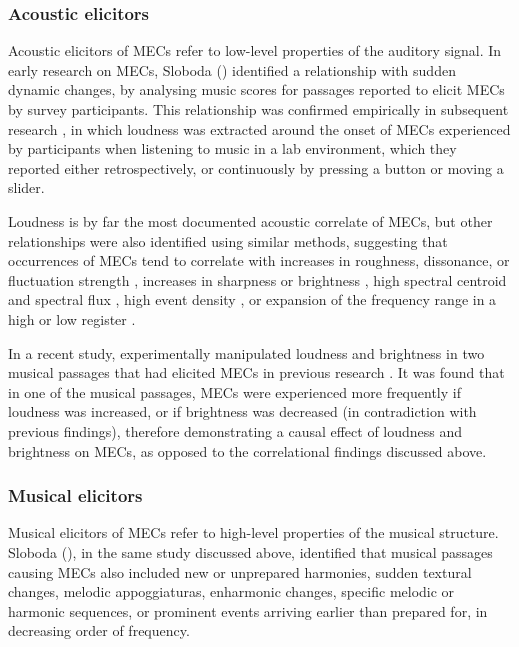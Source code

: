 \subsubsection{Acoustic elicitors}

Acoustic elicitors of MECs refer to low-level properties of the auditory signal. In early research on MECs, Sloboda (\citeyear{sloboda1991}) identified a relationship with sudden dynamic changes, by analysing music scores for passages reported to elicit MECs by survey participants. This relationship was confirmed empirically in subsequent research \parencite{auricchio2017,bannister2018,beier2020,grewe2007,guhn2007,honda2020,nagel2008,polo2017}, in which loudness was extracted \parencite[or manually inspected from music scores in the case of][]{guhn2007} around the onset of MECs experienced by participants when listening to music in a lab environment, which they reported either retrospectively, or continuously by pressing a button or moving a slider.

Loudness is by far the most documented acoustic correlate of MECs, but other relationships were also identified using similar methods, suggesting that occurrences of MECs tend to correlate with increases in roughness, dissonance, or fluctuation strength \parencite{bannister2018,beier2020,grewe2007,nagel2008,park2019}, increases in sharpness or brightness \parencite{bannister2018,beier2020,grewe2007,honda2020}, high spectral centroid and spectral flux \parencite{bannister2018}, high event density \parencite{bannister2018,nagel2008,polo2017}, or expansion of the frequency range in a high or low register \parencite{guhn2007,polo2017}.

In a recent study, \textcite{bannister2020b} experimentally manipulated loudness and brightness in two musical passages that had elicited MECs in previous research \parencite{bannister2018}. It was found that in one of the musical passages, MECs were experienced more frequently if loudness was increased, or if brightness was decreased (in contradiction with previous findings), therefore demonstrating a causal effect of loudness and brightness on MECs, as opposed to the correlational findings discussed above.

\subsubsection{Musical elicitors}

Musical elicitors of MECs refer to high-level properties of the musical structure. Sloboda (\citeyear{sloboda1991}), in the same study discussed above, identified that musical passages causing MECs also included new or unprepared harmonies, sudden textural changes, melodic appoggiaturas, enharmonic changes, specific melodic or harmonic sequences, or prominent events arriving earlier than prepared for, in decreasing order of frequency.

